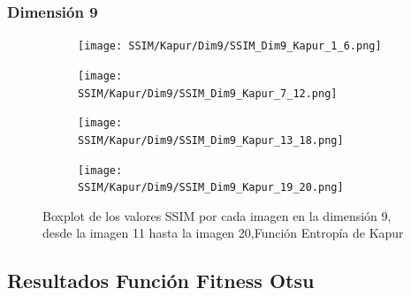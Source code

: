 \documentclass[conference]{IEEEtran}
\begin{document}
\subsubsection{Dimensión 9}

\begin{figure}
	\centering
	
	\begin{subfigure}{0.4\textwidth}
		\texttt{[image: SSIM/Kapur/Dim9/SSIM\_Dim9\_Kapur\_1\_6.png]}
	\end{subfigure}
	
	\begin{subfigure}{0.4\textwidth}
		\texttt{[image: SSIM/Kapur/Dim9/SSIM\_Dim9\_Kapur\_7\_12.png]}
	\end{subfigure}
	\begin{subfigure}{0.4\textwidth}
		\texttt{[image: SSIM/Kapur/Dim9/SSIM\_Dim9\_Kapur\_13\_18.png]}
	\end{subfigure}   
	\begin{subfigure}{0.4\textwidth}
		\texttt{[image: SSIM/Kapur/Dim9/SSIM\_Dim9\_Kapur\_19\_20.png]}
		\vspace{-120pt} %
	\end{subfigure}
	\caption{Boxplot de los valores SSIM por cada imagen en la dimensión 9, desde la imagen 11 hasta la imagen 20,Función Entropía de Kapur}
	\label{fig:imagenes}    
\end{figure}
\subsection{Resultados Función Fitness Otsu}
\end{document}
